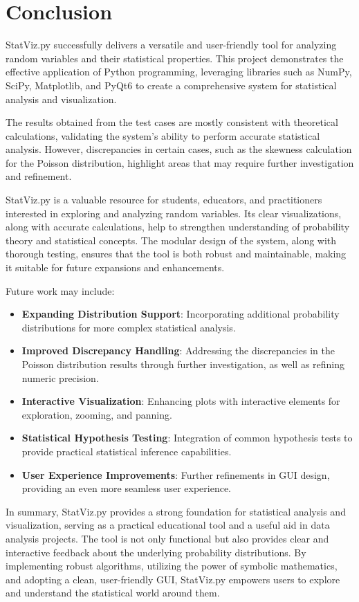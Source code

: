 \documentclass{article}
\begin{document}
\section{Conclusion}

StatViz.py successfully delivers a versatile and user-friendly tool for analyzing random variables and their statistical properties. This project demonstrates the effective application of Python programming, leveraging libraries such as NumPy, SciPy, Matplotlib, and PyQt6 to create a comprehensive system for statistical analysis and visualization.

The results obtained from the test cases are mostly consistent with theoretical calculations, validating the system's ability to perform accurate statistical analysis. However, discrepancies in certain cases, such as the skewness calculation for the Poisson distribution, highlight areas that may require further investigation and refinement.

StatViz.py is a valuable resource for students, educators, and practitioners interested in exploring and analyzing random variables. Its clear visualizations, along with accurate calculations, help to strengthen understanding of probability theory and statistical concepts. The modular design of the system, along with thorough testing, ensures that the tool is both robust and maintainable, making it suitable for future expansions and enhancements.

Future work may include:

\begin{itemize}
    \item \textbf{Expanding Distribution Support}: Incorporating additional probability distributions for more complex statistical analysis.
    \item \textbf{Improved Discrepancy Handling}: Addressing the discrepancies in the Poisson distribution results through further investigation, as well as refining numeric precision.
    \item \textbf{Interactive Visualization}: Enhancing plots with interactive elements for exploration, zooming, and panning.
     \item \textbf{Statistical Hypothesis Testing}: Integration of common hypothesis tests to provide practical statistical inference capabilities.
    \item \textbf{User Experience Improvements}: Further refinements in GUI design, providing an even more seamless user experience.
\end{itemize}

In summary, StatViz.py provides a strong foundation for statistical analysis and visualization, serving as a practical educational tool and a useful aid in data analysis projects. The tool is not only functional but also provides clear and interactive feedback about the underlying probability distributions. By implementing robust algorithms, utilizing the power of symbolic mathematics, and adopting a clean, user-friendly GUI, StatViz.py empowers users to explore and understand the statistical world around them.

\nocite{*}
\printbibliography[heading=bibnumbered]
\end{document}
